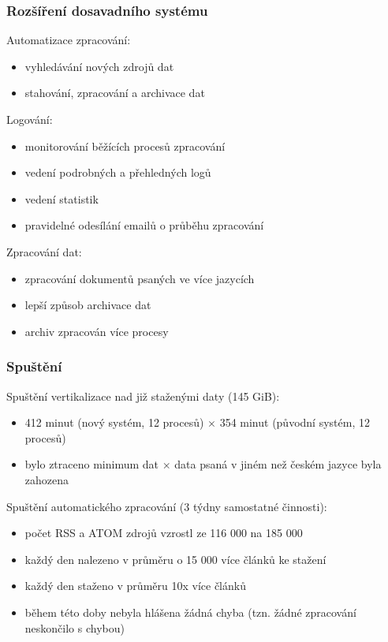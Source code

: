 \documentclass[10pt,xcolor=pdflatex]{beamer}
\begin{document}
\begin{frame}
  \frametitle{Rozšíření dosavadního systému}
  Automatizace zpracování:
  \begin{itemize}
      \item vyhledávání nových zdrojů dat
      \item stahování, zpracování a archivace dat
  \end{itemize}
  Logování:
  \begin{itemize}
      \item monitorování běžících procesů zpracování
      \item vedení podrobných a přehledných logů
      \item vedení statistik
      \item pravidelné odesílání emailů o průběhu zpracování
  \end{itemize}
  Zpracování dat:
  \begin{itemize}
      \item zpracování dokumentů psaných ve více jazycích
      \item lepší způsob archivace dat
      \item archiv zpracován více procesy
  \end{itemize}
\end{frame}

\begin{frame}
  \frametitle{Spuštění}
  Spuštění vertikalizace nad již staženými daty (145 GiB):
  \begin{itemize}
      \item 412 minut (nový systém, 12 procesů) $\times$ 354 minut (původní systém, 12 procesů)
      \item bylo ztraceno minimum dat $\times$ data psaná v jiném než českém jazyce byla zahozena
  \end{itemize}
  Spuštění automatického zpracování (3 týdny samostatné činnosti):
  \begin{itemize}
    \item počet RSS a ATOM zdrojů vzrostl ze 116 000 na 185 000
    \item každý den nalezeno v průměru o 15 000 více článků ke stažení
    \item každý den staženo v průměru 10x více článků
    \item během této doby nebyla hlášena žádná chyba (tzn. žádné zpracování neskončilo s chybou)
  \end{itemize}
\end{frame}
\end{document}
